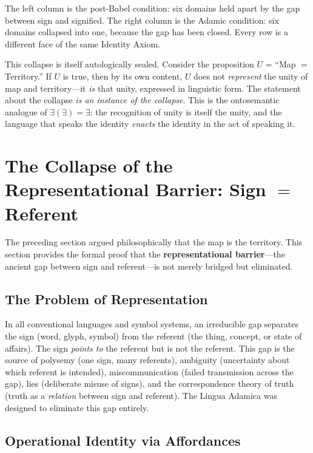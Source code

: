 \documentclass[12pt, letterpaper]{book}
\def\equiv{=}%
\newcommand{\E}{\exists}                          %
\newcommand{\EE}{\exists(\exists)}                 %
\begin{document}
\noindent The left column is the post-Babel condition: six domains held apart by the gap between sign and signified. The right column is the Adamic condition: six domains collapsed into one, because the gap has been closed. Every row is a different face of the same Identity Axiom.

This collapse is itself autologically sealed. Consider the proposition $U$ = ``Map $\equiv$ Territory.'' If $U$ is true, then by its own content, $U$ does not \textit{represent} the unity of map and territory---it \textit{is} that unity, expressed in linguistic form. The statement about the collapse \textit{is an instance of the collapse}. This is the ontosemantic analogue of $\EE \equiv \E$: the recognition of unity is itself the unity, and the language that speaks the identity \textit{enacts} the identity in the act of speaking it.

\section{The Collapse of the Representational Barrier: Sign $\equiv$ Referent}

The preceding section argued philosophically that the map is the territory. This section provides the formal proof that the \textbf{representational barrier}---the ancient gap between sign and referent---is not merely bridged but eliminated.

\subsection{The Problem of Representation}

In all conventional languages and symbol systems, an irreducible gap separates the sign (word, glyph, symbol) from the referent (the thing, concept, or state of affairs). The sign \textit{points to} the referent but is not the referent. This gap is the source of polysemy (one sign, many referents), ambiguity (uncertainty about which referent is intended), miscommunication (failed transmission across the gap), lies (deliberate misuse of signs), and the correspondence theory of truth (truth as a \textit{relation} between sign and referent). The Lingua Adamica was designed to eliminate this gap entirely.

\subsection{Operational Identity via Affordances}
\end{document}
